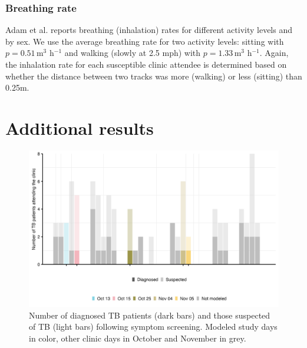 \documentclass[fleqn,11pt]{wlscirep_supp}
\begin{document}
\subsubsection{Breathing rate}

Adam et al.\cite{Adams1993} reports breathing (inhalation) rates for different activity levels and by sex. We use the average breathing rate for two activity levels: sitting with $p = 0.51$\,m$^3$ h$^{-1}$ and walking (slowly at 2.5 mph) with $p = 1.33$\,m$^3$ h$^{-1}$. Again, the inhalation rate for each susceptible clinic attendee is determined based on whether the distance between two tracks was more (walking) or less (sitting) than 0.25m. 

\clearpage

\section{Additional results}\label{sec:additional-results}

\begin{figure}[!htpb]
    \centering
    \includegraphics{results/data/diagnosed-tb-patients.png}
    \caption{Number of diagnosed TB patients (dark bars) and those suspected of TB (light bars) following symptom screening. Modeled study days in color, other clinic days in October and November in grey.}
    \label{fig:diagnosed-tb-patients}
\end{figure}
\end{document}
